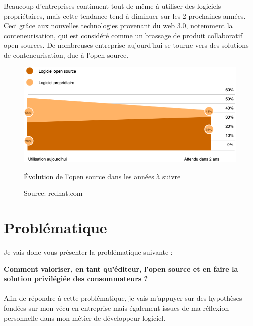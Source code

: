 					Beaucoup d'entreprises continuent tout de même à utiliser des logiciels propriétaires, mais cette tendance tend à diminuer sur les 2 prochaines années. Ceci grâce aux nouvelles technologies provenant du \gls{web 3.0}, notemment la \gls{conteneurisation}, qui est considéré comme un brassage de produit collaboratif open sources. De nombreuses entreprise aujourd'hui se tourne vers des solutions de conteneurisation, due à l'open source.
					
					\begin{figure}[h]
						\center
						\includegraphics[scale=0.60]{./img/osinentreprise.png}
						\caption{Évolution de l'open source dans les années à suivre}
						\caption*{\color{silver}Source: redhat.com}					
					\end{figure}
					\clearpage

	\section{Problématique}
		\paragraph*{}

			Je vais donc vous présenter la problématique suivante :
			\begin{center}
				\begin{displayquote}
					\textbf{Comment valoriser, en tant qu'éditeur, l'open source et en faire la solution privilégiée des consommateurs ?}
				\end{displayquote}
			\end{center}

		\paragraph*{}
			
			Afin de répondre à cette problématique, je vais m'appuyer sur des hypothèses fondées sur mon vécu en entreprise mais également issues de ma réflexion personnelle dans mon métier de développeur logiciel.

